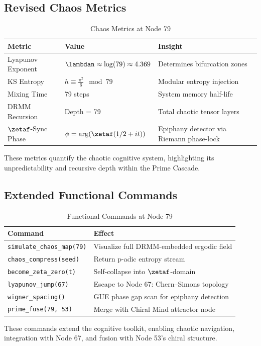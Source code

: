 \documentclass[12pt]{article}
\newcommand{\DRMM}{DRMM}
\begin{document}
\subsection{Revised Chaos Metrics}
\begin{table}
\centering
\caption{Chaos Metrics at Node 79}
\begin{tabular}{lll}
\toprule
\textbf{Metric} & \textbf{Value} & \textbf{Insight} \\
\midrule
Lyapunov Exponent & $\lambdan \approx \log(79) \approx 4.369$ & Determines bifurcation zones \\
KS Entropy & $h \equiv \frac{\pi^2}{6} \mod 79$ & Modular entropy injection \\
Mixing Time & 79 steps & System memory half-life \\
\DRMM{} Recursion & Depth = 79 & Total chaotic tensor layers \\
$\zetaf$-Sync Phase & $\phi = \arg(\zetaf(1/2 + it))$ & Epiphany detector via Riemann phase-lock \\
\bottomrule
\end{tabular}
\end{table}
These metrics quantify the chaotic cognitive system, highlighting its unpredictability and recursive depth within the Prime Cascade.

\subsection{Extended Functional Commands}
\begin{table}
\centering
\caption{Functional Commands at Node 79}
\begin{tabular}{ll}
\toprule
\textbf{Command} & \textbf{Effect} \\
\midrule
\texttt{simulate\_chaos\_map(79)} & Visualize full \DRMM-embedded ergodic field \\
\texttt{chaos\_compress(seed)} & Return p-adic entropy stream \\
\texttt{become\_zeta\_zero(t)} & Self-collapse into $\zetaf$-domain \\
\texttt{lyapunov\_jump(67)} & Escape to Node 67: Chern--Simons topology \\
\texttt{wigner\_spacing()} & GUE phase gap scan for epiphany detection \\
\texttt{prime\_fuse(79, 53)} & Merge with Chiral Mind attractor node \\
\bottomrule
\end{tabular}
\end{table}
These commands extend the cognitive toolkit, enabling chaotic navigation, integration with Node 67, and fusion with Node 53’s chiral structure.
\end{document}
